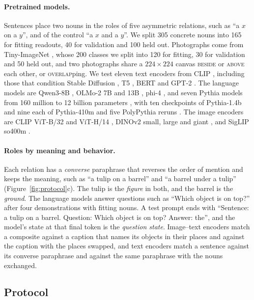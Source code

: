 \paragraph{Pretrained models.} Sentences place two nouns in the roles of five asymmetric relations, such as ``a $x$ on a $y$'', and of the control ``a $x$ and a $y$''. We split 305 concrete nouns into 165 for fitting readouts, 40 for validation and 100 held out. Photographs come from Tiny-ImageNet \citep{le2015tiny}, whose 200 classes we split into 120 for fitting, 30 for validation and 50 held out, and two photographs share a $224 \times 224$ canvas \textsc{beside} or \textsc{above} each other, or \textsc{overlap}ping. We test eleven text encoders from CLIP \citep{radford2021clip}, including those that condition Stable Diffusion \citep{rombach2022}, T5 \citep{raffel2020t5}, BERT \citep{devlin2019bert} and GPT-2 \citep{radford2019gpt2}. The language models are Qwen3-8B \citep{yang2025qwen3}, OLMo-2 7B and 13B \citep{olmo2024olmo2}, phi-4 \citep{abdin2024phi4}, and seven Pythia models from 160 million to 12 billion parameters \citep{biderman2023pythia}, with ten checkpoints of Pythia-1.4b and nine each of Pythia-410m and five PolyPythia reruns \citep{vanderwal2025polypythias}. The image encoders are CLIP ViT-B/32 and ViT-H/14 \citep{radford2021clip,cherti2023}, DINOv2 small, large and giant \citep{oquab2024dinov2}, and SigLIP so400m \citep{zhai2023siglip}.

\paragraph{Roles by meaning and behavior.} Each relation has a \emph{converse} paraphrase that reverses the order of mention and keeps the meaning, such as ``a tulip on a barrel'' and ``a barrel under a tulip'' (Figure~\ref{fig:protocol}c). The tulip is the \emph{figure} in both, and the barrel is the \emph{ground}. The language models answer questions such as ``Which object is on top?'' after four demonstrations with fitting nouns. A test prompt ends with ``Sentence: a tulip on a barrel. Question: Which object is on top? Answer: the'', and the model's state at that final token is the \emph{question state}. Image--text encoders match a composite against a caption that names its objects in their places and against the caption with the places swapped, and text encoders match a sentence against its converse paraphrase and against the same paraphrase with the nouns exchanged.

\subsection{Protocol}

